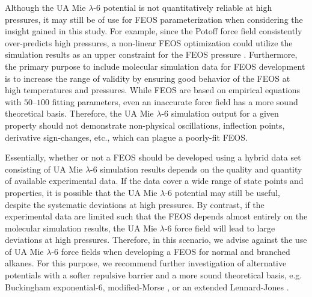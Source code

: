 \documentclass[preprint,letterpaper,floatfix,citeautoscript,aip,jcp]{revtex4-1}
\begin{document}
Although the UA Mie $\lambda$-6 potential is not quantitatively reliable at high pressures, it may still be of use for FEOS parameterization when considering the insight gained in this study. For example, since the Potoff force field consistently over-predicts high pressures, a non-linear FEOS optimization could utilize the simulation results as an upper constraint for the FEOS pressure \cite{Thol_LJTS}. Furthermore, the primary purpose to include molecular simulation data for FEOS development is to increase the range of validity by ensuring good behavior of the FEOS at high temperatures and pressures. While FEOS are based on empirical equations with $50$--$100$ fitting parameters, even an inaccurate force field has a more sound theoretical basis. Therefore, the UA Mie $\lambda$-6 simulation output for a given property should not demonstrate non-physical oscillations, inflection points, derivative sign-changes, etc., which can plague a poorly-fit FEOS.

%
%
%
%


Essentially, whether or not a FEOS should be developed using a hybrid data set consisting of UA Mie $\lambda$-6 simulation results depends on the quality and quantity of available experimental data. If the data cover a wide range of state points and properties, it is possible that the UA Mie $\lambda$-6 potential may still be useful, despite the systematic deviations at high pressures. By contrast, if the experimental data are limited such that the FEOS depends almost entirely on the molecular simulation results, the UA Mie $\lambda$-6 force field will lead to large deviations at high pressures. Therefore, in this scenario, we advise against the use of UA Mie $\lambda$-6 force fields when developing a FEOS for normal and branched alkanes. For this purpose, 
we recommend further investigation of alternative potentials with a softer repulsive barrier and a more sound theoretical basis, e.g. Buckingham exponential-6, modified-Morse \cite{Rowley1999,Rowley2001,Hayes2004}, or an extended Lennard-Jones \cite{Mostafa_Diss,Hajigeorgiou2016,Kalos1972}.
\end{document}
